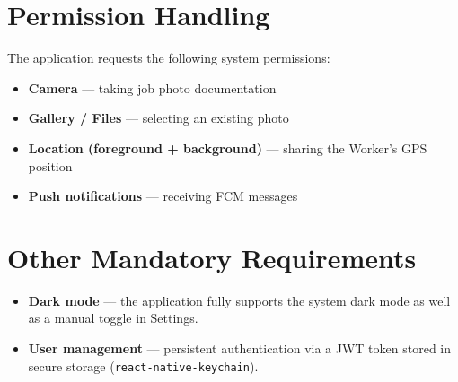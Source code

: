 \section{Permission Handling}

The application requests the following system permissions:

\begin{itemize}
  \item \textbf{Camera} --- taking job photo documentation
  \item \textbf{Gallery / Files} --- selecting an existing photo
  \item \textbf{Location (foreground + background)} --- sharing the Worker's GPS position
  \item \textbf{Push notifications} --- receiving FCM messages
\end{itemize}

\section{Other Mandatory Requirements}

\begin{itemize}
  \item \textbf{Dark mode} --- the application fully supports the system dark mode as well as a manual toggle in Settings.
  \item \textbf{User management} --- persistent authentication via a JWT token stored in secure storage (\texttt{react-native-keychain}).
\end{itemize}